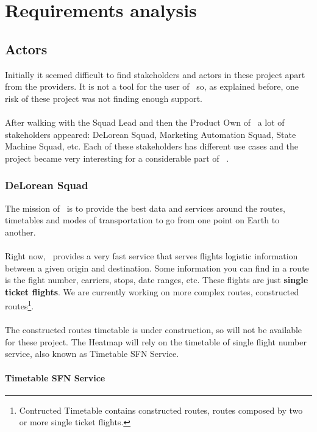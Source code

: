 
\chapter{Requirements analysis}

\label{chapter04}

\section{Actors}

Initially it seemed difficult to find stakeholders and actors in these project apart from the providers. It is not a tool for the user of \company\, so, as explained before, one risk of these project was not finding enough support.
\\\\
After walking with the Squad Lead and then the Product Own of \squad\ a lot of stakeholders appeared: DeLorean Squad, Marketing Automation Squad, State Machine Squad, etc. Each of these stakeholders has different use cases and the project became very interesting for a considerable part of \company\ .

\subsection{DeLorean Squad}

The mission of \squad\ is to provide the best data and services around the routes, timetables and modes of transportation to go from one point on Earth to another.
\\\\
Right now, \squad\ provides a very fast service that serves flights logistic information between a given origin and destination. Some information you can find in a route is the fight number, carriers, stops, date ranges, etc. These flights are just \textbf{single ticket flights}. We are currently working on more complex routes, constructed routes\footnote{Contructed Timetable contains constructed routes, routes composed by two or more single ticket flights. }.
\\\\
The constructed routes timetable is under construction, so will not be available for these project. The Heatmap will rely on the timetable of single flight number service, also known as Timetable SFN Service.

\subsubsection{Timetable SFN Service}


